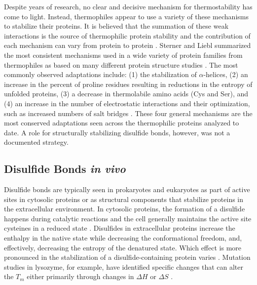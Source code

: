 

Despite years of research, no clear and decisive mechanism for
thermostability has come to light.  Instead, thermophiles appear to use a
variety of these mechanisms to stabilize their proteins. It is believed that the
summation of these weak interactions is the source of thermophilic protein
stability and the contribution of each mechanism can vary from protein to
protein
\cite{chakravarty2002efr,PMID_11577980,vieille2001hes,jaenicke1998spe,petsko2001sbt,rees1995hth}.
Sterner and Liebl summarized the most consistent mechanisms used in a wide
variety of protein families from thermophiles as based on many different protein
structure studies
\cite{PMID_10097079,PMID_11577980,beeby_31,beeby_29,PMID_10940293,thompson1999tel}.
The most commonly observed adaptations include: (1) the stabilization of
$\alpha$-helices, (2) an increase in the percent of proline residues resulting
in reductions in the entropy of unfolded proteins, (3) a decrease in
thermolabile amino acids (Cys and Ser), and (4) an increase in the number of
electrostatic interactions and their optimization, such as increased numbers of
salt bridges \cite{PMID_11256505}. These four general mechanisms are the most
conserved adaptations seen across the thermophilic proteins analyzed to date.
A role for structurally stabilizing disulfide bonds, however, was not a
documented strategy.

\subsection{Disulfide Bonds \emph{in vivo}}


Disulfide bonds are typically seen in prokaryotes and eukaryotes as part of 
active sites in cytosolic proteins or as structural components that stabilize
proteins in the extracellular environment.  In cytosolic proteins, the
formation of a disulfide happens during catalytic reactions and the cell
generally maintains the active site cysteines in a reduced state
\cite{32,33,34,35}.   Disulfides in extracellular proteins increase the
enthalpy in the native state while decreasing the conformational freedom, and,
effectively, decreasing the entropy of the denatured state.  Which effect is
more pronounced in the stabilization of a disulfide-containing protein varies
\cite{119,121,120}. Mutation studies in lysozyme, for example, have identified
specific changes that can alter the ${T }_{m }$ either primarily through
changes in $\Delta H$ or $\Delta S$ \cite{125,124}. 

